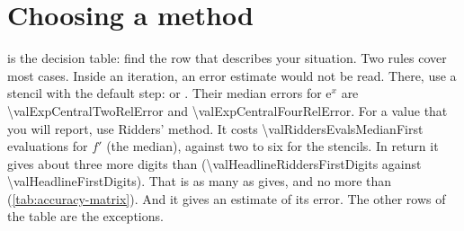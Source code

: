 \section{Choosing a method}\label{sec:using-choosing}

 is the decision table: find the row that describes your situation. Two rules cover most
cases. Inside an iteration, an error estimate would not be read. There, use a stencil with the default step:
 or . Their median errors for $\mathrm{e}^x$ are \num{\valExpCentralTwoRelError}
and \num{\valExpCentralFourRelError}. For a value that you will report, use Ridders' method. It costs
\num{\valRiddersEvalsMedianFirst} evaluations for $f'$ (the median), against two to six for the stencils. In return
it gives about three more digits than  (\num{\valHeadlineRiddersFirstDigits} against
\num{\valHeadlineFirstDigits}). That is as many as  gives, and no more than 
(\cref{tab:accuracy-matrix}). And it gives an estimate of its error. The other rows of the table are the exceptions.

